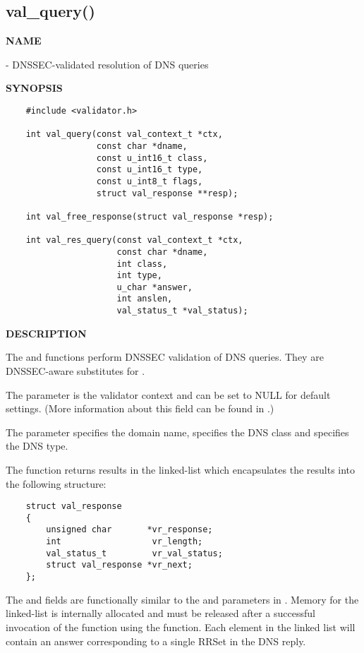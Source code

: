 \clearpage

\subsection{\bf val\_query()}

{\bf NAME}

 - DNSSEC-validated resolution of DNS queries

{\bf SYNOPSIS}

\begin{verbatim}
    #include <validator.h>

    int val_query(const val_context_t *ctx,
                  const char *dname,
                  const u_int16_t class,
                  const u_int16_t type,
                  const u_int8_t flags,
                  struct val_response **resp);

    int val_free_response(struct val_response *resp);

    int val_res_query(const val_context_t *ctx,
                      const char *dname,
                      int class,
                      int type,
                      u_char *answer,
                      int anslen,
                      val_status_t *val_status);
\end{verbatim}

{\bf DESCRIPTION}

The  and  functions perform DNSSEC
validation of DNS queries.  They are DNSSEC-aware substitutes for
.

The  parameter is the validator context and can be set to NULL for
default settings.  (More information about this field can be found in
.)

The  parameter specifies the domain name,  specifies the
DNS class and  specifies the DNS type.

The  function returns results in the  linked-list
which encapsulates the results into the following structure:

\begin{verbatim}
    struct val_response
    {
        unsigned char       *vr_response;
        int                  vr_length;
        val_status_t         vr_val_status;
        struct val_response *vr_next;
    };
\end{verbatim}

The  and  fields are functionally similar to
the  and  parameters in .  Memory
for the  linked-list is internally allocated and must be released
after a successful invocation of the function using the
 function.  Each element in the  linked
list will contain an answer corresponding to a single RRSet in the DNS reply.

